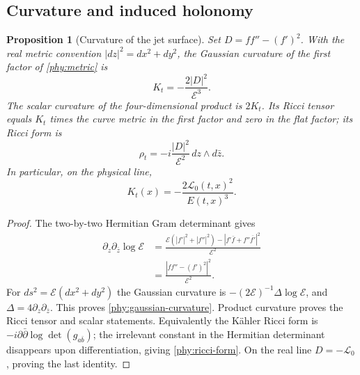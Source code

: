 \documentclass[11pt]{article}
\numberwithin{equation}{section}
\newtheorem{proposition}[theorem]{Proposition}
\theoremstyle{definition}
\theoremstyle{remark}
\begin{document}
\subsection{Curvature and induced holonomy}

\begin{proposition}[Curvature of the jet surface]
\label{phy:curvature}
Set $D=ff''-(f')^2$.  With the real metric convention
$|dz|^2=dx^2+dy^2$, the Gaussian curvature of the first factor of
\eqref{phy:metric} is
\begin{equation}
 K_t=-\frac{2|D|^2}{\mathcal E^3}.
 \label{phy:gaussian-curvature}
\end{equation}
The scalar curvature of the four-dimensional product is $2K_t$.  Its Ricci
tensor equals $K_t$ times the curve metric in the first factor and zero in
the flat factor; its Ricci form is
\begin{equation}
 \rho_t=-i\frac{|D|^2}{\mathcal E^2}\,dz\wedge d\bar z.
 \label{phy:ricci-form}
\end{equation}
In particular, on the physical line,
\begin{equation}
 K_t(x)=-\frac{2\mathcal L_0(t,x)^2}{E(t,x)^3}.
 \label{phy:curvature-squares-sign}
\end{equation}
\end{proposition}
\begin{proof}
The two-by-two Hermitian Gram determinant gives
\begin{align*}
 \partial_z\partial_{\bar z}\log\mathcal E
 &=\frac{\mathcal E(|f'|^2+|f''|^2)
        -|f'\bar f+f''\overline{f'}|^2}{\mathcal E^2}\\
 &=\frac{|ff''-(f')^2|^2}{\mathcal E^2}.
\end{align*}
For $ds^2=\mathcal E(dx^2+dy^2)$ the Gaussian curvature is
$-(2\mathcal E)^{-1}\Delta\log\mathcal E$, and
$\Delta=4\partial_z\partial_{\bar z}$.  This proves
\eqref{phy:gaussian-curvature}.  Product curvature proves the Ricci tensor
and scalar statements.  Equivalently the Kähler Ricci form is
$-i\partial\bar\partial\log\det(g_{a\bar b})$; the irrelevant constant
in the Hermitian determinant disappears upon differentiation, giving
\eqref{phy:ricci-form}.  On the real line $D=-\mathcal L_0$, proving the
last identity.
\end{proof}
\end{document}
